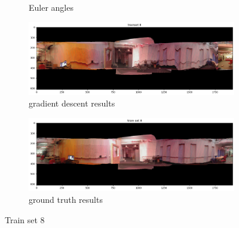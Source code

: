 \documentclass[conference]{IEEEtran}
\begin{document}
\begin{figure}[h]
\begin{subfigure}{0.4\textwidth}
        \caption{Euler angles}
        \label{fig:8ea}
    \end{subfigure}
    \begin{subfigure}{0.4\textwidth}
        \includegraphics[width=\linewidth]{../img/pano_8_gd.png}
        \caption{gradient descent results}
        \label{fig:8p}
    \end{subfigure}
    \begin{subfigure}{0.4\textwidth}
        \includegraphics[width=\linewidth]{../img/pano_8_gt.png}
        \caption{ground truth results}
        \label{fig:8pt}
    \end{subfigure}

    \caption{Train set 8}
    \label{fig:set8}
\end{figure}
\end{document}
